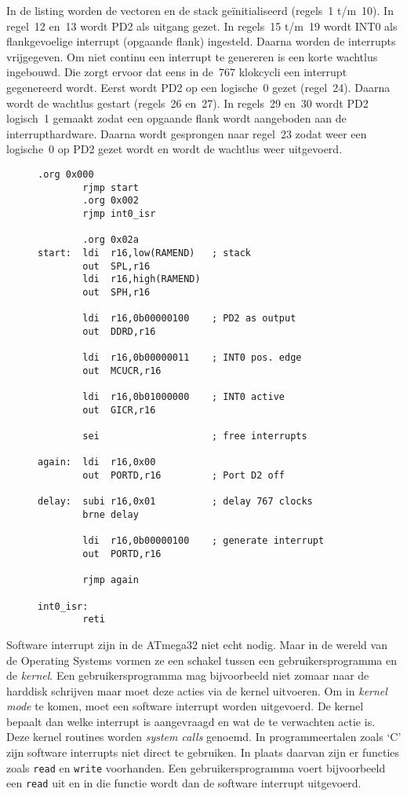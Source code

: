In de listing worden de vectoren en de stack ge\"initialiseerd (regels~1
t/m~10). In regel~12 en~13 wordt PD2 als uitgang gezet. In regels~15
t/m~19 wordt INT0 als flankgevoelige interrupt (opgaande flank) ingesteld.
Daarna worden de interrupts vrijgegeven. Om niet continu een interrupt te
genereren is een korte wachtlus ingebouwd. Die zorgt ervoor dat eens in
de~767 klokcycli een interrupt gegenereerd wordt. Eerst wordt PD2 op een
logische~0 gezet (regel~24). Daarna wordt de wachtlus gestart (regels~26
en~27). In regels~29 en~30 wordt PD2 logisch~1 gemaakt zodat een opgaande
flank wordt aangeboden aan de interrupthardware. Daarna wordt gesprongen
naar regel~23 zodat weer een logische~0 op PD2 gezet wordt en wordt de
wachtlus weer uitgevoerd.

\begin{figure}[!ht]
\begin{lstlisting}[language=AVRassembler,caption=Externe interrupt INT0 wordt gebruikt als software interrupt.,label=cod:intint0swint]
		.org 0x000
		rjmp start
		.org 0x002
		rjmp int0_isr

		.org 0x02a
start:	ldi  r16,low(RAMEND)   ; stack
		out  SPL,r16
		ldi  r16,high(RAMEND)
		out  SPH,r16

		ldi  r16,0b00000100    ; PD2 as output
		out  DDRD,r16

		ldi  r16,0b00000011    ; INT0 pos. edge
		out  MCUCR,r16

		ldi  r16,0b01000000    ; INT0 active
		out  GICR,r16

		sei                    ; free interrupts

again:	ldi  r16,0x00
        out  PORTD,r16         ; Port D2 off

delay:	subi r16,0x01          ; delay 767 clocks
		brne delay

		ldi  r16,0b00000100    ; generate interrupt
		out  PORTD,r16

		rjmp again

int0_isr:
		reti
\end{lstlisting}
\end{figure}

Software interrupt zijn in de ATmega32 niet echt nodig. Maar in de wereld
van de Operating Systems vormen ze een schakel tussen een gebruikersprogramma
en de \textsl{kernel}. Een gebruikersprogramma mag bijvoorbeeld niet zomaar
naar de harddisk schrijven maar moet deze acties via de kernel uitvoeren. Om
in \textsl{kernel mode} te komen, moet een software interrupt worden
uitgevoerd. De kernel bepaalt dan welke interrupt is aangevraagd en wat de te
verwachten actie is. Deze kernel routines worden \textsl{system calls} genoemd.
In programmeertalen zoals `C' zijn software interrupts niet direct te gebruiken.
In plaats daarvan zijn er functies zoals \lstinline|read| en \lstinline|write|
voorhanden. Een gebruikersprogramma voert bijvoorbeeld een \lstinline|read| uit
en in die functie wordt dan de software interrupt uitgevoerd.

